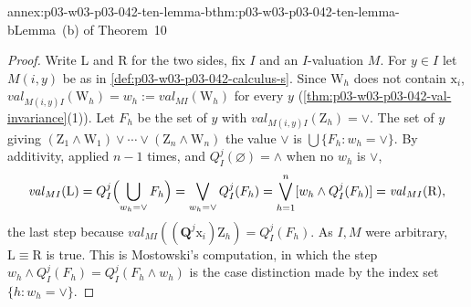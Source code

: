 \begin{annexitem}{annex:p03-w03-p03-042-ten-lemma-b}{thm:p03-w03-p03-042-ten-lemma-b}{Lemma~(b) of Theorem~10}
\begin{proof}
Write L and R for the two sides, fix \(I\) and an \(I\)-valuation \(M\).
For \(y\in I\) let \(M(i,y)\) be as in
\cref{def:p03-w03-p03-042-calculus-s}.  Since \(\mathrm W_h\) does not
contain \(\mathrm x_i\), \(\mathit{val}_{M(i,y)I}(\mathrm W_h)=w_h:=
\mathit{val}_{MI}(\mathrm W_h)\) for every \(y\)
(\cref{thm:p03-w03-p03-042-val-invariance}(1)).  Let \(F_h\) be the set
of \(y\) with \(\mathit{val}_{M(i,y)I}(\mathrm Z_h)=\vee\).  The set of
\(y\) giving \((\mathrm Z_1\wedge\mathrm W_1)\vee\cdots\vee(\mathrm Z_n
\wedge\mathrm W_n)\) the value \(\vee\) is \(\bigcup\{F_h:w_h=\vee\}\).
By additivity, applied \(n-1\) times, and \(Q^j_I(\varnothing)=\wedge\)
when no \(w_h\) is \(\vee\),
\[
 \mathit{val}_{MI}(\mathrm L)=Q^j_I\Bigl(\bigcup_{w_h=\vee}F_h\Bigr)=
 \bigvee_{w_h=\vee}Q^j_I(F_h)=\bigvee_{h=1}^{n}[w_h\wedge Q^j_I(F_h)]
 =\mathit{val}_{MI}(\mathrm R),
\]
the last step because \(\mathit{val}_{MI}((\mathbf Q^j\mathrm x_i)
\mathrm Z_h)=Q^j_I(F_h)\).  As \(I,M\) were arbitrary, \(\mathrm L\equiv
\mathrm R\) is true.  This is Mostowski's computation, in which the step
\(w_h\wedge Q^j_I(F_h)=Q^j_I(F_h\wedge w_h)\) is the case distinction made
by the index set \(\{h:w_h=\vee\}\).
\end{proof}
\end{annexitem}

